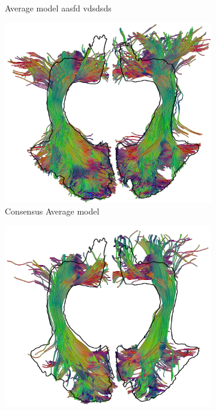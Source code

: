 \begin{figure}
\begin{minipage}{0.24\linewidth}
\begin{subfigure}[b]{\linewidth}
		\caption{Average model {\color{white} aasfd vdsdsds}}
	\end{subfigure}
	\begin{subfigure}[b]{\linewidth}
		\includegraphics[width=\linewidth]{or-avg-bootstrap-c}
		\caption{Consensus Average model}
\end{subfigure} 
	\end{minipage} \hfil 
	\begin{minipage}{0.24\linewidth} 
	\begin{subfigure}[b]{\linewidth}
		\includegraphics[width=\linewidth]{or-sel-c}

\end{subfigure}
\end{minipage}
\end{figure}
